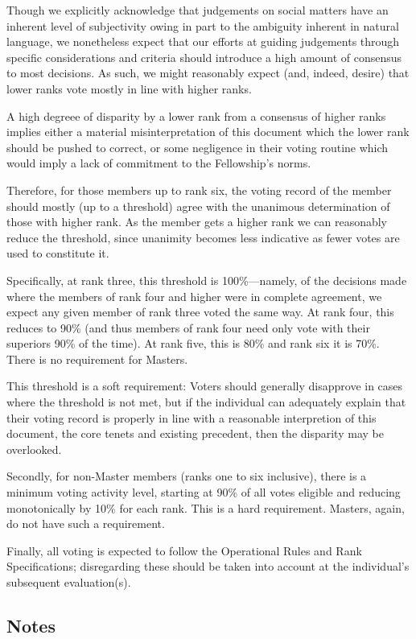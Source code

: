 \documentclass[9pt,oneside]{amsart}
\begin{document}
Though we explicitly acknowledge that judgements on social matters have an inherent level of subjectivity owing in part to the ambiguity inherent in natural language, we nonetheless expect that our efforts at guiding judgements through specific considerations and criteria should introduce a high amount of consensus to most decisions. As such, we might reasonably expect (and, indeed, desire) that lower ranks vote mostly in line with higher ranks.

A high degreee of disparity by a lower rank from a consensus of higher ranks implies either a material misinterpretation of this document which the lower rank should be pushed to correct, or some negligence in their voting routine which would imply a lack of commitment to the Fellowship's norms.

Therefore, for those members up to rank six, the voting record of the member should mostly (up to a threshold) agree with the unanimous determination of those with higher rank. As the member gets a higher rank we can reasonably reduce the threshold, since unanimity becomes less indicative as fewer votes are used to constitute it.

Specifically, at rank three, this threshold is 100\%---namely, of the decisions made where the members of rank four and higher were in complete agreement, we expect any given member of rank three voted the same way. At rank four, this reduces to 90\% (and thus members of rank four need only vote with their superiors 90\% of the time). At rank five, this is 80\% and rank six it is 70\%. There is no requirement for Masters.

This threshold is a soft requirement: Voters should generally disapprove in cases where the threshold is not met, but if the individual can adequately explain that their voting record is properly in line with a reasonable interpretion of this document, the core tenets and existing precedent, then the disparity may be overlooked.

Secondly, for non-Master members (ranks one to six inclusive), there is a minimum voting activity level, starting at 90\% of all votes eligible and reducing monotonically by 10\% for each rank. This is a hard requirement. Masters, again, do not have such a requirement.

Finally, all voting is expected to follow the Operational Rules and Rank Specifications; disregarding these should be taken into account at the individual's subsequent evaluation(s).

\subsection{Notes}\label{notes}
\end{document}
